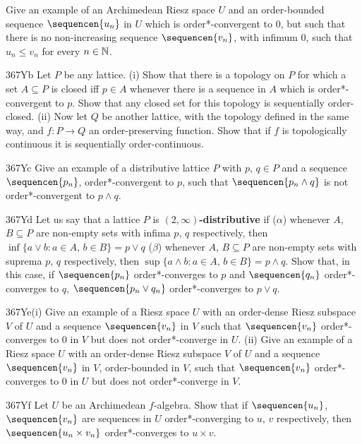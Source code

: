 {
Give an example of an Archimedean Riesz space $U$ and an
order-bounded sequence $\sequencen{u_n}$ in $U$ which is
order*-convergent to $0$, but such that there is no non-increasing
sequence $\sequencen{v_n}$, with infimum $0$, such that $u_n\le v_n$ for
every $n\in\Bbb N$.
     
\spheader 367Yb Let $P$ be any lattice.  (i) Show that there is a
topology on $P$ for which a set $A\subseteq P$ is closed iff $p\in A$
whenever there is a sequence in $A$ which is order*-convergent to
$p$.   Show that any closed set for this topology is sequentially
order-closed.   (ii) Now let $Q$ be another lattice, with the
topology defined in the same way, and $f:P\to Q$ an order-preserving
function.  Show that if $f$ is topologically
continuous it is sequentially order-continuous.
     
\spheader 367Yc Give an example of a distributive lattice $P$ with $p$, $q\in P$ and a sequence $\sequencen{p_n}$, order*-convergent to $p$, such that $\sequencen{p_n\wedge q}$ is not order*-convergent to
$p\wedge q$.
     
\spheader 367Yd Let us say that a lattice $P$ is {\bf
$(2,\infty)$-distributive} if ($\alpha$) whenever $A$, $B\subseteq P$
are non-empty sets with infima $p$, $q$ respectively, then $\inf\{a\vee
b:a\in A,\,b\in B\}=p\vee q$
($\beta$) whenever $A$, $B\subseteq P$ are non-empty sets with suprema
$p$, $q$ respectively, then $\sup\{a\wedge b:a\in A,\,b\in B\}=p\wedge
q$.   Show that, in this case, if $\sequencen{p_n}$ order*-converges
to $p$ and $\sequencen{q_n}$ order*-converges to $q$,
$\sequencen{p_n\vee q_n}$ order*-converges to $p\vee q$.
     
\spheader 367Ye(i) Give an example of a Riesz space $U$ with an
order-dense Riesz subspace $V$ of $U$ and a sequence $\sequencen{v_n}$
in $V$ such that
$\sequencen{v_n}$ order*-converges to $0$ in $V$ but does not
order*-converge in $U$.
(ii) Give an example of a Riesz space $U$ with an order-dense Riesz
subspace $V$ of $U$ and a sequence $\sequencen{v_n}$ in $V$,
order-bounded in $V$, such that
$\sequencen{v_n}$ order*-converges to $0$ in $U$ but does not
order*-converge in $V$.
     
\spheader 367Yf Let $U$ be an Archimedean $f$-algebra.   Show that if
$\sequencen{u_n}$, $\sequencen{v_n}$ are sequences in $U$
order*-converging to $u$, $v$ respectively, then
$\sequencen{u_n\times v_n}$ order*-converges to $u\times v$.
     
}
